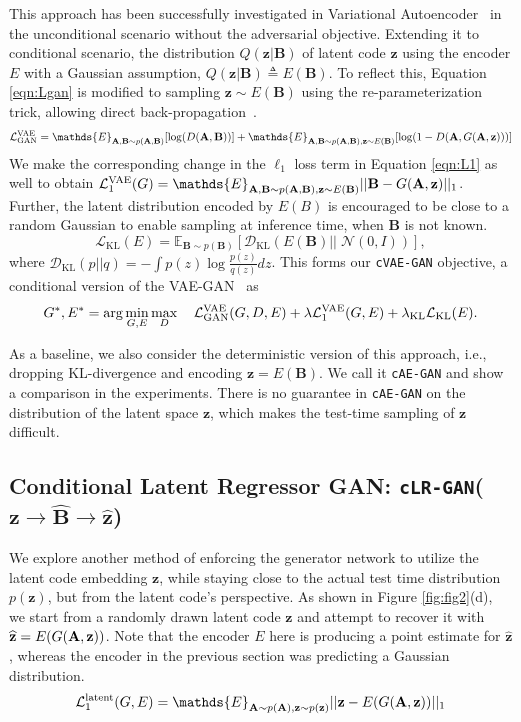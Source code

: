 \documentclass{article}
\newcommand{\cinfogan}{\texttt{cLR-GAN}\xspace}
\newcommand{\cae}{\texttt{cAE-GAN}\xspace}
\newcommand{\cvaegan}{\texttt{cVAE-GAN}\xspace}
\newcommand{\D}{D\xspace}
\newcommand{\E}{E\xspace}
\newcommand{\A}{\mathbf{A}\xspace}
\newcommand{\B}{\mathbf{B}\xspace}
\newcommand{\Bh}{\widehat{\mathbf{B}}\xspace}
\newcommand{\z}{\mathbf{z}\xspace}
\newcommand{\zh}{\widehat{\mathbf{z}}\xspace}
\begin{document}
This approach has been successfully investigated in Variational Autoencoder~\citep{kingma2013auto} in the unconditional scenario without the adversarial objective. Extending it to conditional scenario, the distribution $Q(\z|\B)$ of latent code $\z$ using the encoder $\E$ with a Gaussian assumption, $Q(\z|\B)\triangleq\E(\B)$. To reflect this, Equation \ref{eqn:Lgan} is modified to sampling $\z\sim\E(\B)$ using the re-parameterization trick, allowing direct back-propagation~\citep{kingma2013auto}. 
\begin{equation}
\mathcal{L}_{\text{GAN}}^{\text{VAE}} = \mathds{E}_{\A,\B\sim p(\A,\B)}[\log(\D(\A,\B))] + \mathds{E}_{\A,\B\sim p(\A,\B),\z\sim E(\B)}[ \log(1-\D(\A,\G(\A,\z)))]
\label{eqn:LVAE}
\end{equation}
We make the corresponding change in the $\ell_1$ loss term in Equation \ref{eqn:L1} as well to obtain $\mathcal{L}_1^{\text{VAE}}(\G)=\mathds{E}_{\A,\B\sim p(\A,\B),\z\sim \E(\B)} ||\B - \G(\A,\z) ||_1$. Further, the latent distribution encoded by $E(B)$ is encouraged to be close to a random Gaussian to enable sampling at inference time, when $\B$ is not known.
\begin{equation}
\mathcal{L}_{\text{KL}}(\E) = \mathds{E}_{\B\sim p(\B)} [ \mathcal{D}_{\text{KL}}(\E(\B) || \;\mathcal{N}(0,I)) ],
\label{eqn:KL}
\end{equation}
where $\mathcal{D}_{\text{KL}}(p||q)=-\int  p(z) \log\frac{p(z)}{q(z)}dz $. This forms our \cvaegan objective, a conditional version of the VAE-GAN~\citep{larsen2016vaegan} as
\begin{equation}
\G^{*}, \E^{*} = \arg\min_{\G,\E} \max_{\D}  \quad \mathcal{L}_{\text{GAN}}^{\text{VAE}}(\G,\D,\E)
+ \lambda\mathcal{L}_1^{\text{VAE}}(\G, \E)+\lambda_{\text{KL}}\mathcal{L}_{\text{KL}}(\E).
\end{equation}

As a baseline, we also consider the deterministic version of this approach, i.e., dropping KL-divergence and encoding $\z=E(\B)$.
We call it \cae and show a comparison in the experiments.
There is no guarantee in \cae on the distribution of the latent space $\z$, which makes the test-time sampling of $\z$ difficult. 

\subsection{Conditional Latent Regressor GAN: \cinfogan ($\z \rightarrow \Bh \rightarrow \zh$)}
We explore another method of enforcing the generator network to utilize the latent code embedding $\z$, while staying close to the actual test time distribution $p(\z)$, but from the latent code's perspective.
As shown in Figure \ref{fig:fig2}(d), we start from a 
randomly drawn latent code $\z$ and attempt to recover it with $\zh=\E(\G(\A,\z))$.
Note that the encoder $\E$ here is producing a point estimate for $\zh$, whereas the encoder in the previous section was predicting a Gaussian distribution.
\begin{equation}
\mathcal{L}_{1}^{\text{latent}}(\G,\E) = \mathds{E}_{\A\sim p(\A),\z\sim p(\z)} ||\z - \E(\G(\A,\z)) ||_1
\label{eqn:L1_lacyc}
\end{equation}
\end{document}
